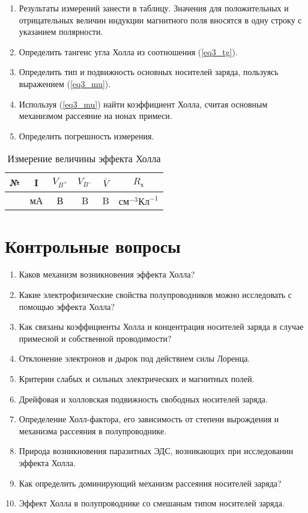\begin{enumerate}
\item Результаты измерений занести в таблицу. Значения для положительных и отрицательных величин индукции магнитного поля вносятся в одну строку с указанием полярности.
\item Определить тангенс угла Холла из соотношения (\ref{eq3_tg}).
\item Определить тип и подвижность основных носителей заряда, пользуясь выражением (\ref{eq3_mu}).
\item Используя (\ref{eq3_mu}) найти коэффициент Холла, считая основным механизмом рассеяние на ионах примеси.
\item Определить погрешность измерения.
\end{enumerate}

\begin{table}[h!]
\caption{Измерение величины эффекта Холла}
\begin{center}
\begin{tabular}{c|c|c|c|c|c}
№ & I & $V_{B^{+}}$ & $V_{B^{-}}$ & $\overline{V}$ & $R_{\text{х}}$ \\
\hline
& мА & В & B & B & $\text{см}^{-3}\text{Кл}^{-1}$ \\
\hline
\end{tabular}
\end{center}
\end{table}

\section{Контрольные вопросы}

\begin{enumerate}
\item Каков механизм возникновения эффекта Холла?
\item Какие электрофизические свойства полупроводников можно исследовать с помощью эффекта Холла?
\item Как связаны коэффициенты Холла и концентрация носителей заряда в случае примесной и собственной проводимости?
\item Отклонение электронов и дырок под действием силы Лоренца.
\item Критерии слабых и сильных электрических и магнитных полей.
\item Дрейфовая и холловская подвижность свободных носителей заряда.
\item Определение Холл-фактора, его зависимость от степени вырождения и механизма рассеяния в полупроводнике.
\item Природа возникновения паразитных ЭДС, возникающих при исследовании эффекта Холла.
\item Как определить доминирующий механизм рассеяния носителей заряда?
\item Эффект Холла в полупроводнике со смешаным типом носителей заряда.
\end{enumerate}

